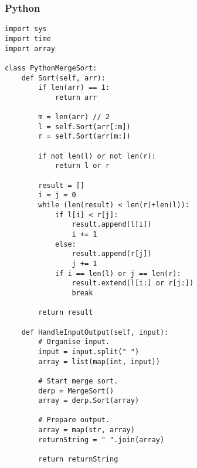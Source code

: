 \subsubsection{Python}
\lstset{style=python}
\begin{lstlisting}
import sys
import time
import array

class PythonMergeSort:
	def Sort(self, arr):
		if len(arr) == 1:
			return arr

		m = len(arr) // 2
		l = self.Sort(arr[:m])
		r = self.Sort(arr[m:])

		if not len(l) or not len(r):
			return l or r

		result = []
		i = j = 0
		while (len(result) < len(r)+len(l)):
			if l[i] < r[j]:
				result.append(l[i])
				i += 1
			else:
				result.append(r[j])
				j += 1
			if i == len(l) or j == len(r):
				result.extend(l[i:] or r[j:])
				break

		return result

	def HandleInputOutput(self, input):
		# Organise input.
		input = input.split(" ")
		array = list(map(int, input))

		# Start merge sort.
		derp = MergeSort()
		array = derp.Sort(array)

		# Prepare output.
		array = map(str, array)
		returnString = " ".join(array)

		return returnString

\end{lstlisting}

